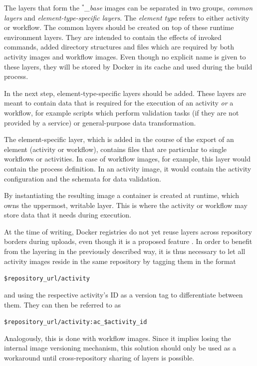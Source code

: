  The layers that form the \emph{$^*$\_base} images can be separated in two groups, \emph{common layers} and \emph{element-type-specific layers}. The \emph{element type} refers to either activity or workflow.
  The common layers should be created on top of these runtime environment layers. They are intended to contain the effects of invoked commands, added directory structures and files which are required by both activity images and workflow images. Even though no explicit name is given to these layers, they will be stored by Docker in its cache and used during the build process.

  In the next step, element-type-specific layers should be added. These layers are meant to contain data that is required for the execution of an activity \emph{or} a workflow, for example scripts which perform validation tasks (if they are not provided by a service) or general-purpose data transformation.

  The element-specific layer, which is added in the course of the export of an element (activity or workflow), contains files that are particular to single workflows or activities. In case of workflow images, for example, this layer would contain the process definition. In an activity image, it would contain the activity configuration and the schemata for data validation.

  By instantiating the resulting image a container is created at runtime, which owns the uppermost, writable layer. This is where the activity or workflow may store data that it needs during execution.

  At the time of writing, Docker registries do not yet reuse layers across repository borders during uploads, even though it is a proposed feature \cite{Mcgowan2015Proposal}. In order to benefit from the layering in the previously described way, it is thus necessary to let all activity images reside in the same repository by tagging them in the format

  \centerline{\texttt{\$repository\_url/activity}}

  and using the respective activity's \ac{ID} as a version tag to differentiate between them. They can then be referred to as

  \centerline{\texttt{\$repository\_url/activity:ac\_\$activity\_id}}

  Analogously, this is done with workflow images. Since it implies losing the internal image versioning mechanism, this solution should only be used as a workaround until cross-repository sharing of layers is possible.

